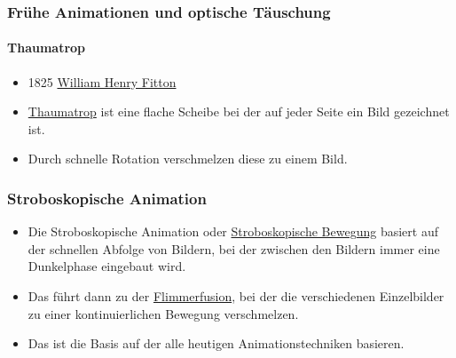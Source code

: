 \begin{frame}
    \frametitle{Frühe Animationen und optische Täuschung}
    \framesubtitle{Thaumatrop}
    \begin{minipage}{0.5\textwidth}
        \begin{itemize}
            \item 1825 \href{https://de.wikipedia.org/wiki/William_Henry_Fitton}{William Henry Fitton}
            \item \href{https://de.wikipedia.org/wiki/Thaumatrop}{Thaumatrop} ist eine flache Scheibe bei der auf jeder Seite ein Bild gezeichnet ist.
            \item Durch schnelle Rotation verschmelzen diese zu einem Bild.

        \end{itemize}
    \end{minipage} \hfill
    \begin{minipage}{0.45\textwidth}
    \end{minipage}
\end{frame}

\begin{frame}
    \frametitle{Stroboskopische Animation}
    \begin{itemize}
        \item Die Stroboskopische Animation oder \href{https://de.wikipedia.org/wiki/Beta-Bewegung}{Stroboskopische Bewegung} basiert auf der schnellen Abfolge von Bildern, bei der zwischen den Bildern immer eine Dunkelphase eingebaut wird.
        \item Das führt dann zu der \href{https://de.wikipedia.org/wiki/Persistenz_des_Sehens\#Flimmerfusion}{Flimmerfusion}, bei der die verschiedenen Einzelbilder zu einer kontinuierlichen Bewegung verschmelzen.
        \item Das ist die Basis auf der alle heutigen Animationstechniken basieren.
    \end{itemize}
\end{frame}

